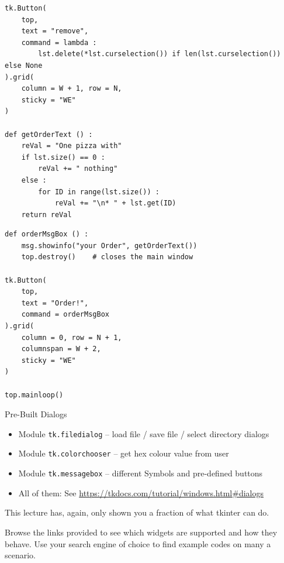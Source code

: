 \begin{frame}[fragile]
%
\begin{codebox}
\begin{verbatim}
tk.Button(
    top,
    text = "remove",
    command = lambda :
        lst.delete(*lst.curselection()) if len(lst.curselection()) else None
).grid(
    column = W + 1, row = N,
    sticky = "WE"
)

def getOrderText () :
    reVal = "One pizza with"
    if lst.size() == 0 :
        reVal += " nothing"
    else :
        for ID in range(lst.size()) :
            reVal += "\n* " + lst.get(ID)
    return reVal
\end{verbatim}
\end{codebox}
%
\end{frame}


\begin{frame}[fragile]
%
\begin{codebox}
\begin{verbatim}
def orderMsgBox () :
    msg.showinfo("your Order", getOrderText())
    top.destroy()    # closes the main window

tk.Button(
    top,
    text = "Order!",
    command = orderMsgBox
).grid(
    column = 0, row = N + 1,
    columnspan = W + 2,
    sticky = "WE"
)

top.mainloop()
\end{verbatim}
\end{codebox}
%
\end{frame}


\begin{frame}[fragile]{Pre-Built Dialogs}
%
\begin{itemize}
\item Module \texttt{tk.filedialog} -- load file / save file / select directory dialogs
\item Module \texttt{tk.colorchooser} -- get hex colour value from user
\item Module \texttt{tk.messagebox} -- different Symbols and pre-defined buttons
\item All of them: See \url{https://tkdocs.com/tutorial/windows.html#dialogs}
\end{itemize}
%
\begin{hintbox}
This lecture has, again, only shown you a fraction of what tkinter can do.

Browse the links provided to see which widgets are supported and how they behave. Use your search engine of choice to find example codes on many a scenario.
\end{hintbox}
%
\end{frame}

